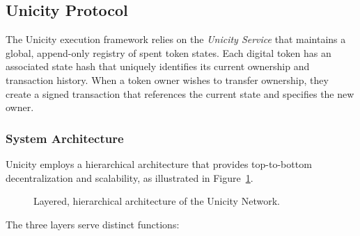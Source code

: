 \documentclass{article}
\begin{document}
\subsection{Unicity Protocol}

The Unicity execution framework relies on the \emph{Unicity Service} that maintains a global, append-only registry of spent token states. Each digital token has an associated state hash that uniquely identifies its current ownership and transaction history. When a token owner wishes to transfer ownership, they create a signed transaction that references the current state and specifies the new owner.

\subsubsection{System Architecture}

Unicity employs a hierarchical architecture that provides top-to-bottom decentralization and scalability, as illustrated in Figure~\ref{fig:layers}.

\begin{figure}[!htbp]
    \centering
    \caption{Layered, hierarchical architecture of the Unicity Network.}\label{fig:layers}
\end{figure}

The three layers serve distinct functions:
\end{document}
